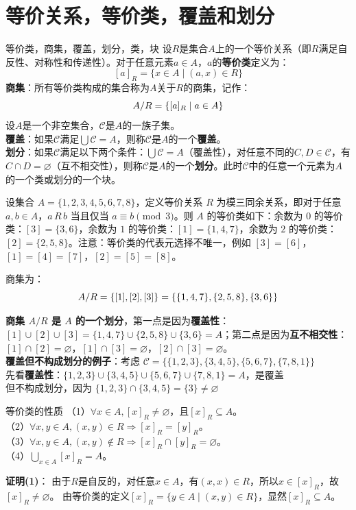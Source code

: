 \documentclass[lang=cn,11pt]{elegantbook}
\begin{document}
\section{等价关系，等价类，覆盖和划分}
\begin{definition}{等价类，商集，覆盖，划分，类，块}
设$R$是集合$A$上的一个等价关系（即$R$满足自反性、对称性和传递性）。对于任意元素$a \in A$，$a$的\textbf{等价类}定义为：\vspace{-10pt}
\[
[a]_R = \{x \in A \mid (a,x) \in R\}
\]
\textbf{商集}：所有等价类构成的集合称为$A$关于$R$的商集，记作：\vspace{-5pt}
\[
A/R = \{[a]_R \mid a \in A\}\vspace{-5pt}
\]
设$A$是一个非空集合，$\mathcal{C}$是$A$的一族子集。\\
\textbf{覆盖}：如果$\mathcal{C}$满足$\bigcup\mathcal{C}=A$，则称$\mathcal{C}$是$A$的一个\textbf{覆盖}。\\
\textbf{划分}：如果$\mathcal{C}$满足以下两个条件：$\bigcup\mathcal{C}=A$（覆盖性），对任意不同的$C,D\in\mathcal{C}$，有$C\cap D=\varnothing$（互不相交性），则称$\mathcal{C}$是$A$的一个\textbf{划分}。此时$\mathcal{C}$中的任意一个元素为$A$的一个类或划分的一个块。
\end{definition}
设集合 $A = \{1, 2, 3, 4, 5, 6, 7, 8\}$，定义等价关系 $R$ 为模三同余关系，即对于任意 $a, b \in A$，$a \, R \, b$ 当且仅当 $a \equiv b \pmod{3}$。则 $A$ 的等价类如下：余数为 $0$ 的等价类：$[3] = \{3, 6\}$，余数为 $1$ 的等价类：$[1] = \{1, 4, 7\}$，余数为 $2$ 的等价类：$[2] = \{2, 5, 8\}$。注意：等价类的代表元选择不唯一，例如 $[3] = [6]$，$[1] = [4] = [7]$，$[2] = [5] = [8]$。

商集为：\vspace{-5pt}
\[
A/R = \{[1], [2], [3]\} = \{\{1,4,7\}, \{2,5,8\}, \{3,6\}\}\vspace{-5pt}
\]

\textbf{商集 $A/R$ 是 $A$ 的一个划分}，第一点是因为\textbf{覆盖性}：$[1] \cup [2] \cup [3] = \{1,4,7\} \cup \{2,5,8\} \cup \{3,6\} = A$；第二点是因为\textbf{互不相交性}：$[1] \cap [2] = \varnothing$，$[1] \cap [3] = \varnothing$，$[2] \cap [3] = \varnothing$。\\
\textbf{覆盖但不构成划分的例子}：考虑 $\mathcal{C} = \{\{1,2,3\}, \{3,4,5\}, \{5,6,7\}, \{7,8,1\}\}$\\先看\textbf{覆盖性}：$\{1,2,3\} \cup \{3,4,5\} \cup \{5,6,7\} \cup \{7,8,1\} = A$，是覆盖
\\但不构成划分，因为 $\{1,2,3\} \cap \{3,4,5\} = \{3\} \neq \varnothing$
\begin{theorem}{等价类的性质}
（1）$\forall x\in A,[x]_R\ne\varnothing$，且$[x]_R\subseteq A$。\\
（2）$\forall x,y\in A,(x,y)\in R\Rightarrow [x]_R=[y]_R$。\\
（3）$\forall x,y\in A,(x,y)\notin R\Rightarrow [x]_R\cap[y]_R=\varnothing$。\\
（4）$\bigcup_{x\in A} [x]_R = A$。
\end{theorem}
\textbf{证明(1)}：
由于$R$是自反的，对任意$x \in A$，有$(x,x) \in R$，所以$x \in [x]_R$，故$[x]_R \neq \varnothing$。
由等价类的定义$[x]_R = \{y \in A \mid (x,y) \in R\}$，显然$[x]_R \subseteq A$。
\end{document}
